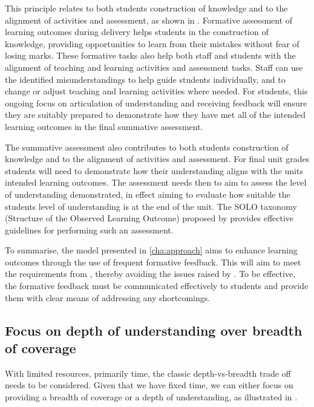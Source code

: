 This principle relates to both students construction of knowledge and to the alignment of activities and assessment, as shown in . Formative assessment of learning outcomes during delivery helps students in the construction of knowledge, providing opportunities to learn from their mistakes without fear of losing marks. These formative tasks also help both staff and students with the alignment of teaching and learning activities and assessment tasks. Staff can use the identified misunderstandings to help guide students individually, and to change or adjust teaching and learning activities where needed. For students, this ongoing focus on articulation of understanding and receiving feedback will ensure they are suitably prepared to demonstrate how they have met all of the intended learning outcomes in the final summative assessment.

The summative assessment also contributes to both students construction of knowledge and to the alignment of activities and assessment. For final unit grades students will need to demonstrate how their understanding aligns with the units intended learning outcomes. The assessment needs then to aim to assess the level of understanding demonstrated, in effect aiming to evaluate how suitable the students level of understanding is at the end of the unit. The SOLO taxonomy (Structure of the Observed Learning Outcome) proposed by \citet{Biggs:1982} provides effective guidelines for performing such an assessment.

To summarise, the model presented in \cref{cha:approach} aims to enhance learning outcomes through the use of frequent formative feedback. This will aim to meet the requirements from \citet{Gibbs:2004}, thereby avoiding the issues raised by \citet{Smith:2005}. To be effective, the formative feedback must be communicated effectively to students and provide them with clear means of addressing any shortcomings.


\subsection{Focus on depth of understanding over breadth of coverage} %
\label{ssub:focus_on_depth_of_understanding_over_breadth_of_coverage_}

With limited resources, primarily time, the classic depth-vs-breadth trade off needs to be considered. Given that we have fixed time, we can either focus on providing a breadth of coverage or a depth of understanding, as illustrated in . 

